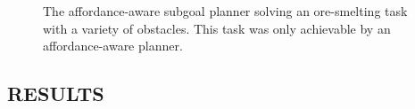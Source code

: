 \documentclass[]{article}
\begin{document}
\begin{figure}
\centering
%
%
%
%
  \caption{The affordance-aware subgoal planner solving an ore-smelting task with a variety of obstacles. This task
  was only achievable by an affordance-aware planner.}
  \label{fig:epicworld}
\end{figure}


\subsection{RESULTS}
\end{document}

